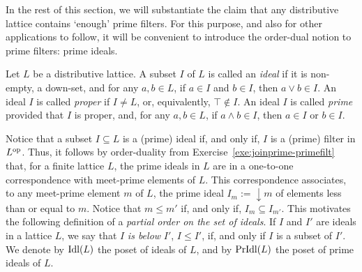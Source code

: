 In the rest of this section, we will substantiate the claim that any distributive lattice contains `enough' prime filters. For this purpose, and also for other applications to follow, it will be convenient to introduce the order-dual notion to prime filters: prime ideals.
\begin{definition}\label{def:ideal}
Let $L$ be a distributive lattice. A subset $I$ of $L$ is called an \emph{ideal} if it is non-empty, a down-set, and for any $a, b \in L$, if $a \in I$ and $b \in I$, then $a \vee b \in I$. An ideal $I$ is called \emph{proper} if $I \neq L$, or, equivalently, $\top \not\in I$. An ideal $I$ is called \emph{prime} provided that $I$ is proper, and, for any $a, b \in L$, if $a \wedge b \in I$, then $a \in I$ or $b \in I$.
\end{definition}
Notice that a subset $I \subseteq L$ is a (prime) ideal if, and only if, $I$ is a (prime) filter in $L^{\mathrm{op}}$. Thus, it follows by order-duality from Exercise~\ref{exe:joinprime-primefilt} that, for a finite lattice $L$, the prime ideals in $L$ are in a one-to-one correspondence with meet-prime elements of $L$. This correspondence associates, to any meet-prime element $m$ of $L$, the prime ideal $I_m := {\downarrow}m$ of elements less than or equal to $m$. Notice that $m \leq m'$ if, and only if, $I_m \subseteq I_{m'}$. This motivates the following definition of a \emph{partial order on the set of ideals}. If $I$ and $I'$ are ideals in a lattice $L$, we say that $I$ \emph{is below} $I'$, $I \leq I'$, if, and only if $I$ is a subset of $I'$. We denote by $\mathrm{Idl}(L)$ the poset of ideals of $L$, and by $\mathrm{PrIdl}(L)$ the poset of prime ideals of $L$.

